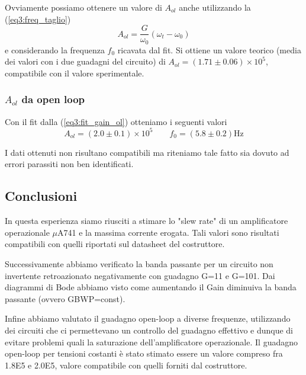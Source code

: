 Ovviamente possiamo ottenere un valore di $A_{ol}$ anche utilizzando la (\ref{eq3:freq_taglio})
$$A_{ol} = \frac{G}{\omega_0} (\omega_t - \omega_0)$$
e considerando la frequenza $f_0$ ricavata dal fit. Si ottiene un valore teorico (media dei valori con i due guadagni del circuito) di $A_{ol} = (1.71\pm 0.06)\times 10^5$, compatibile con il valore sperimentale.

\subsubsection{$A_{ol}$ da open loop}

Con il fit dalla (\ref{eq3:fit_gain_ol}) otteniamo i seguenti valori
$$A_{ol}=(2.0\pm0.1)\times 10^5 \qquad f_0=(5.8\pm0.2)\si{\hertz}$$

I dati ottenuti non risultano compatibili ma riteniamo tale fatto sia dovuto ad errori parassiti non ben identificati.

\subsection*{Conclusioni}

In questa esperienza siamo riusciti a stimare lo "slew rate" di un amplificatore operazionale $\mu$A741 e la massima corrente erogata. Tali valori sono risultati compatibili con quelli riportati sul datasheet del costruttore. 

Successivamente abbiamo verificato la banda passante per un circuito non invertente retroazionato negativamente con guadagno G=11 e G=101. Dai diagrammi di Bode abbiamo visto come aumentando il Gain diminuiva la banda passante (ovvero GBWP=const).

Infine abbiamo valutato il guadagno open-loop a diverse frequenze, utilizzando dei circuiti che ci permettevano un controllo del guadagno effettivo e dunque di evitare problemi quali la saturazione dell'amplificatore operazionale. Il guadagno open-loop per tensioni costanti è stato stimato essere un valore compreso fra \num{1.8E5} e \num{2.0E5}, valore compatibile con quelli forniti dal costruttore.